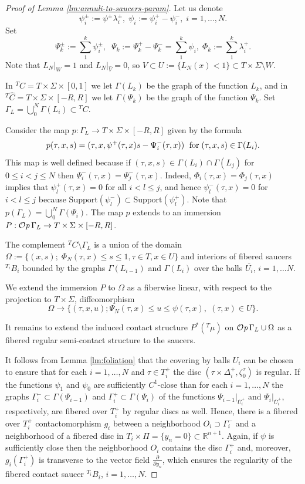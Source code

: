 \documentclass[12pt]{paper}
\theoremstyle{plain}
\theoremstyle{definition}
\newcommand{\wh}{\widehat}
\newcommand{\ol}{\overline}
\newcommand{\p}{\partial}
\newcommand{\R}{{\mathbb{R}}}
\newcommand{\Supp}{\mathrm{Support}}
\def\Op{{\mathcal O}{\it p}\,}
\numberwithin{figure}{section}
\begin{document}
\begin{proof}[Proof of Lemma \ref{lm:annuli-to-saucers-param}]
 Let us denote
$$\psi^\pm_i:=\psi^\pm\lambda^\pm_i,\;
 \psi_i:=\psi^+_i-\psi^-_i,\; i=1,\dots, N.$$ 
 Set $$\Psi_k^\pm:=\sum\limits_1^k\psi^\pm_i,\;\; \Psi_k:=  \Psi_k^+-\Psi_k^-=\sum\limits_1^k\psi_i,\;\Phi_k:=\sum\limits_1^k\lambda^+_i.$$
Note that $L_N|_{ W}=1$ and $L_N|_{\wh V}=0$, so $V \subset U:= \{L_N(x) < 1\} \subset T\times\Sigma \setminus   W$.

In ${}^TC=T\times\Sigma\times[0,1]$ we let $\Gamma(L_k)$ be the graph of the function $L_k$, and in ${}^T\wh C = T\times\Sigma\times[-R,R]$ we let $\Gamma(\Psi_k)$ be the graph of the function  $\Psi_k$. Set
$\Gamma_L=\bigcup\limits_0^N \Gamma(L_i)\subset {}^TC$. 

 
Consider the map $p:{ \Gamma_L}\to T\times \Sigma\times[-R,R]$ given by the formula
 $$p(\tau,x,s)=(\tau,x,  \psi^+(\tau,x)s -\Psi^-_i(\tau,x))\; \hbox{ for}\;(\tau,x,s)\in \Gamma(L_i).$$
  This map is well defined because if $(\tau, x,s)\in   \Gamma(L_i)\cap  \Gamma(L_j)$ for $0\leq i<j\leq N$ then
 $\Psi^-_i(\tau,x)=\Psi^-_j(\tau,x).$ Indeed, $\Phi_i(\tau, x)=\Phi_j(\tau,x)$ implies that $\psi^+_l(\tau,x)=0$ for all $i<l\leq j$, and hence $\psi^-_l(\tau,x)=0$ for   $i<l\leq j$ because $\Supp(\psi^-_l)\subset\Supp(\psi^+_l)$.
 Note that  $p({ \Gamma_L})=\bigcup\limits_0^N \Gamma(\Psi_i)$.
 The map $p$  extends to an immersion $P:\Op{ \Gamma_L}\to T\times \Sigma\times[-R,R]$.
 

 The complement ${}^TC\setminus \Gamma_L$ is a union of the 
 domain $\Omega:=\{(x,s);\;\Phi_N(\tau,x)\leq s\leq 1, \tau\in T, x\in U\}$ and  interiors of fibered saucers ${}^{T_i}B_i$ bounded by the graphs $\Gamma(L_{i-1})$ and $\Gamma(L_i)$ over the balls $\overline{U_i}$, $i=1,\dots N$.
 
 We extend the immersion $P$   to $\Omega$ as a fiberwise linear,
 with respect to the projection to $T\times \Sigma$,
 diffeomorphism
  $$\Omega\to\{(\tau, x,u);  \Psi_N(\tau,x)\leq u\leq  \psi(\tau, x),\;(\tau,x)\in U\}.$$
 
It  remains to extend the induced contact structure $P^*\left({}^T\mu\right)$ on $\Op{ \Gamma_L}\cup \Omega$ as a fibered regular semi-contact structure to the saucers.  
 
 It follows from Lemma \ref {lm:foliation} that the covering by balls $U_i$ can be chosen to ensure   that for each $i=1,\dots, N$ and  $\tau \in T^+_i$ the  disc  $(\tau\times\Delta^+_i, \zeta^\tau_0)$ is regular.
 If the functions $ \psi_1$  and $ \psi_0$ are sufficiently $C^1$-close than    for each  $i=1,\dots, N$ the graphs $\Gamma^-_i \subset \Gamma(\Psi_{i-1})$ and $\Gamma^+_i \subset \Gamma(\Psi_i)$ of the functions $\Psi_{i-1}|_{\ol U_i^+}$ and $\Psi_{i}|_{\ol U_i^+}$, respectively, are fibered over $T_i^+$ by regular discs  as well.
Hence, there is a fibered over $T_i^+$ contactomorphism $g_i$ between a neighborhood    $O_i\supset\Gamma_i^-$  and a neighborhood of a  fibered disc in $T_i\times \Pi=\{y_n=0\}\subset\R^{n+1}$.
Again, if $ \psi$ is  sufficiently close then  the neighborhood $O_i$ contains the disc $\Gamma_i^+$ and, moreover, $g_i(\Gamma^+_i)$ is transverse to the vector field $\frac\p{\p y_n}$, which ensures the regularity of the fibered  contact saucer ${}^{T_i}B_i$, $i=1,\dots, N$.


\end{proof}
\end{document}
